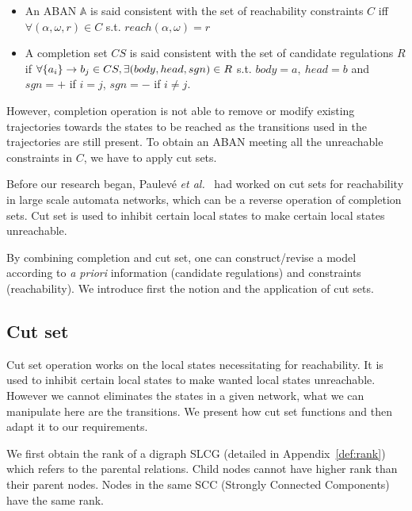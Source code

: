 \begin{definition}[Consistency]\label{def:consistencyFirst}
\leavevmode
\makeatletter
\@nobreaktrue
\makeatother
\begin{itemize}
    \item An ABAN $\mathbb{A}$ is said consistent with the set of reachability constraints $C$ iff $\forall (\alpha,\omega,r)\in C$ s.t. $reach(\alpha,\omega)=r$
    \item A completion set $CS$ is said consistent with the set of candidate regulations $R$ if $\forall \acm{a_i}{b_{1-j}}{b_j}\in CS, \exists (body,head,sgn)\in R$ s.t. $body=a,\ head=b$ and $sgn=+$ if $i=j$, $sgn=-$ if $i\neq j$. 
\end{itemize}
    
\end{definition}

However, completion operation is not able to remove or modify existing trajectories towards the states to be reached as the transitions used in the trajectories are still present.
To obtain an ABAN meeting all the unreachable constraints in $C$, we have to apply cut sets.

Before our research began, Paulev\'e \textit{et al.}~\cite{PAK13-CAV} had worked on cut sets for reachability in large scale automata networks, which can be a reverse operation of completion sets.
Cut set is used to inhibit certain local states to make certain local states unreachable.

By combining completion and cut set, one can construct/revise a model according to \textit{a priori} information (candidate regulations) and constraints (reachability).
We introduce first the notion and the application of cut sets.

\subsection{Cut set}\label{sec:cutsetModelInfer}

Cut set operation works on the local states necessitating for reachability. 
It is used to inhibit certain local states to make wanted local states unreachable.
However we cannot eliminates the states in a given network, what we can manipulate here are the transitions. 
We present how cut set functions and then adapt it to our requirements.

We first obtain the rank of a digraph SLCG (detailed in Appendix~\ref{def:rank}) which refers to the parental relations.
Child nodes cannot have higher rank than their parent nodes.
Nodes in the same SCC (Strongly Connected Components) have the same rank.


